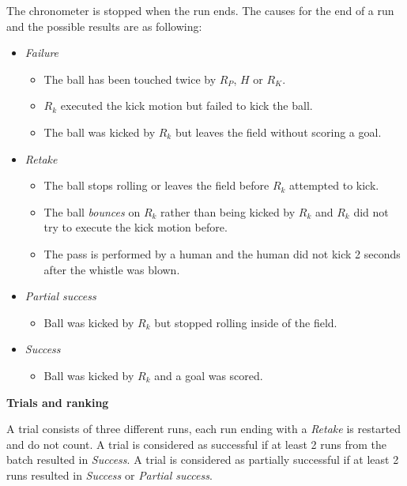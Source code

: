 \smallskip

The chronometer is stopped when the run ends. The causes for the end of a run and
the possible results are as following:
\begin{itemize}
\item \textit{Failure}
  \begin{itemize}
    \item The ball has been touched twice by $R_P$, $H$ or $R_K$.
    \item $R_k$ executed the kick motion but failed to kick the ball.
    \item The ball was kicked by $R_k$ but leaves the field without scoring a goal.
  \end{itemize}
\item \textit{Retake}
  \begin{itemize}
    \item The ball stops rolling or leaves the field before $R_k$ attempted to kick.
    \item The ball \emph{bounces} on $R_k$ rather than being kicked by $R_k$ and
          $R_k$ did not try to execute the kick motion before.
    \item The pass is performed by a human and the human did not kick 2 seconds after
          the whistle was blown.
  \end{itemize}
\item \textit{Partial success}
  \begin{itemize}
    \item Ball was kicked by $R_k$ but stopped rolling inside of the field.
  \end{itemize}
\item \textit{Success}
  \begin{itemize}
    \item Ball was kicked by $R_k$ and a goal was scored.
  \end{itemize}
\end{itemize}

{\bfseries Trials and ranking}

A trial consists of three different runs, each run ending with a \textit{Retake}
is restarted and do not count. A trial is considered as successful if at least 2
runs from the batch resulted in \textit{Success}. A trial is considered as
partially successful if at least 2 runs resulted in \textit{Success} or \textit{Partial success}.

